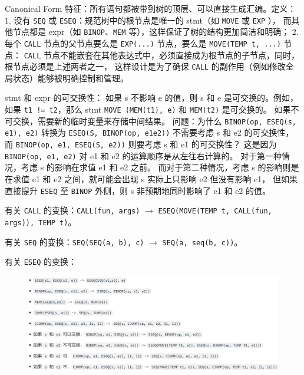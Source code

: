 \par \noindent Canonical Form 特征：所有语句都被带到树的顶层、可以直接生成汇编。定义：
1. 没有 \texttt{SEQ} 或 \texttt{ESEQ}：规范树中的根节点是唯一的 stmt（如 \texttt{MOVE} 或 \texttt{EXP} ），
而其他节点都是 expr（如 \texttt{BINOP}、\texttt{MEM} 等），这样保证了树的结构更加简洁和明确；
2. 每个 \texttt{CALL} 节点的父节点要么是 \texttt{EXP(...)} 节点，要么是 \texttt{MOVE(TEMP t, ...)} 节点：
\texttt{CALL} 节点不能嵌套在其他表达式中，必须直接成为根节点的子节点，同时，根节点必须是上述两者之一，
这样设计是为了确保 \texttt{CALL} 的副作用（例如修改全局状态）能够被明确控制和管理。

\par \noindent stmt 和 expr 的可交换性：
如果 s 不影响 e 的值，则 s 和 e 是可交换的。例如，如果 \texttt{t1 != t2}，那么 stmt \texttt{MOVE (MEM(t1), e)} 和 \texttt{MEM(t2)} 是可交换的。
如果不可交换，需要新的临时变量来存储中间结果。
问题：为什么 \texttt{BINOP(op, ESEQ(s, e1), e2)} 转换为 \texttt{ESEQ(S, BINOP(op, e1e2))} 不需要考虑 s 和 e2 的可交换性，
而 \texttt{BINOP(op, e1, ESEQ(S, e2))} 则要考虑 s 和 e1 的可交换性？
这是因为 \texttt{BINOP(op, e1, e2)} 对 e1 和 e2 的运算顺序是从左往右计算的。
对于第一种情况，考虑 s 的影响在求值 e1 和 e2 之前。
而对于第二种情况，考虑 s 的影响则是在求值 e1 和 e2 之间，就可能会出现 s 实际上只影响 e2 但没有影响 e1，
但如果直接提升 \texttt{ESEQ} 至 \texttt{BINOP} 外侧，则 s 非预期地同时影响了 e1 和 e2 的值。

\par \noindent 有关 \texttt{CALL} 的变换：\texttt{CALL(fun, args)} $\rightarrow$ \texttt{ESEQ(MOVE(TEMP t, CALL(fun, args)), TEMP t)}。

\par \noindent 有关 \texttt{SEQ} 的变换：\texttt{SEQ(SEQ(a, b), c)} $\rightarrow$ \texttt{SEQ(a, seq(b, c))}。

\par \noindent 有关 \texttt{ESEQ} 的变换：

\begin{figure}[H]
    \centering
    \includegraphics[width=\linewidth]{figures/irc1.png}
\end{figure}

